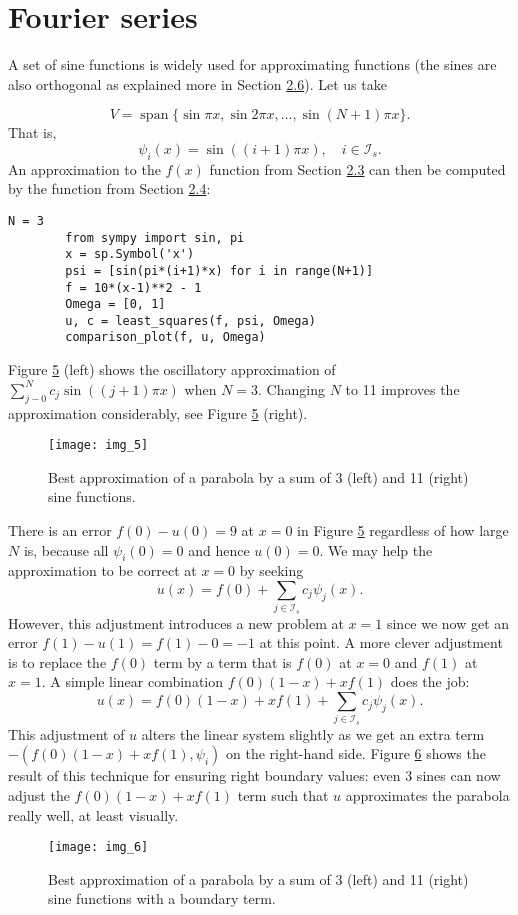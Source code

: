 \documentclass[../main.tex]{subfiles}
\begin{document}
	\section[Fourier series]{Fourier series}
	\label{sec:sec_2_7}
	\noindent A set of sine functions is widely used for approximating functions (the sines are
	also orthogonal as explained more in Section \hyperref[sec:sec_2_6]{2.6}). Let us take
	
	$$
	V=\operatorname{span}\{\sin \pi x, \sin 2 \pi x, \ldots, \sin (N+1) \pi x\}.
	$$
	That is,
	$$
	\psi_{i}(x)=\sin ((i+1) \pi x), \quad i \in \mathcal{I}_{s} .
	$$
	An approximation to the $f(x)$ function from Section \hyperref[sec:sec_2_3]{2.3} can then be computed by the  function from Section \hyperref[sec:sec_2_4]{2.4}:
	\begin{lstlisting}[numbers=none]
		N = 3
		from sympy import sin, pi
		x = sp.Symbol('x')
		psi = [sin(pi*(i+1)*x) for i in range(N+1)]
		f = 10*(x-1)**2 - 1
		Omega = [0, 1]
		u, c = least_squares(f, psi, Omega)
		comparison_plot(f, u, Omega)
	\end{lstlisting}
	Figure \hyperref[fig:img_5]{5} (left) shows the oscillatory approximation of $\sum_{j-0}^{N} c_{j} \sin ((j+1) \pi x)$ when $N=3$. Changing $N$ to 11 improves the approximation considerably, see Figure \hyperref[fig:img_5]{5} (right).
	\begin{figure}[H]
		\centering
		\texttt{[image: img\_5]}
		\caption{Best approximation of a parabola by a sum of 3 (left) and 11 (right) sine functions.}
		\label{fig:img_5}
	\end{figure}
	
	There is an error $f(0)-u(0)=9$ at $x=0$ in Figure \hyperref[fig:img_5]{5} regardless of how large $N$ is, because all $\psi_{i}(0)=0$ and hence $u(0)=0$. We may help the approximation to be correct at $x=0$ by seeking
	\begin{equation}\label{eqa39}
		u(x)=f(0)+\sum_{j \in \mathcal{I}_{s}} c_{j} \psi_{j}(x).
	\end{equation}
	However, this adjustment introduces a new problem at $x=1$ since we now get an error $f(1)-u(1)=f(1)-0=-1$ at this point. A more clever adjustment is to replace the $f(0)$ term by a term that is $f(0)$ at $x=0$ and $f(1)$ at $x=1$. A simple linear combination $f(0)(1-x)+x f(1)$ does the job:
	\begin{equation}\label{eqa40}
		u(x)=f(0)(1-x)+x f(1)+\sum_{j \in \mathcal{I}_{s}} c_{j} \psi_{j}(x).
	\end{equation}
	\noindent This adjustment of $u$ alters the linear system slightly as we get an extra term $-\left(f(0)(1-x)+x f(1), \psi_{i}\right)$ on the right-hand side. Figure \hyperref[fig:img_6]{6} shows the result of this technique for ensuring right boundary values: even 3 sines can now adjust the $f(0)(1-x)+x f(1)$ term such that $u$ approximates the parabola really well, at least visually.
	\begin{figure}[H]
		\centering
		\texttt{[image: img\_6]}
		\caption{Best approximation of a parabola by a sum of 3 (left) and 11 (right)
			sine functions with a boundary term.}
		\label{fig:img_6}
	\end{figure}
\end{document}
